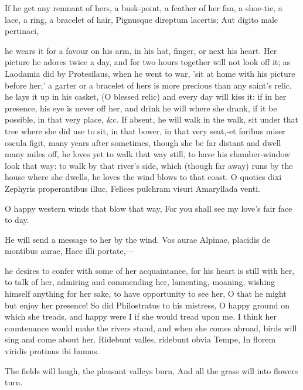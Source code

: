 {If he get any remnant of hers, a busk-point, a feather of her fan, a
shoe-tie, a lace, a ring, a bracelet of hair,
Pignusque direptum lacertis;
Aut digito male pertinaci,

he wears it for a favour on his arm, in his hat, finger, or next his
heart. Her picture he adores twice a day, and for two hours together
will not look off it; as Laodamia did by Protesilaus, when he went to
war, 'sit at home with his picture before her;' a garter or a
bracelet of hers is more precious than any saint's relic, he lays it up
in his casket, (O blessed relic) and every day will kiss it: if in her
presence, his eye is never off her, and drink he will where she drank,
if it be possible, in that very place, \&c. If absent, he will walk in
the walk, sit under that tree where she did use to sit, in that bower,
in that very seat,-et foribus miser oscula figit, many years
after sometimes, though she be far distant and dwell many miles off, he
loves yet to walk that way still, to have his chamber-window look that
way: to walk by that river's side, which (though far away) runs by the
house where she dwells, he loves the wind blows to that coast.
O quoties dixi Zephyris properantibus illuc,
Felices pulchram visuri Amaryllada venti.

O happy western winds that blow that way,
For you shall see my love's fair face to day.

He will send a message to her by the wind.
Vos aurae Alpinae, placidis de montibus aurae,
Haec illi portate,---

he desires to confer with some of her acquaintance, for his heart
is still with her, to talk of her, admiring and commending her,
lamenting, moaning, wishing himself anything for her sake, to have
opportunity to see her, O that he might but enjoy her presence! So did
Philostratus to his mistress, O happy ground on which she treads,
and happy were I if she would tread upon me. I think her countenance
would make the rivers stand, and when she comes abroad, birds will sing
and come about her.
Ridebunt valles, ridebunt obvia Tempe,
In florem viridis protinus ibi humus.

The fields will laugh, the pleasant valleys burn,
And all the grass will into flowers turn.

}
